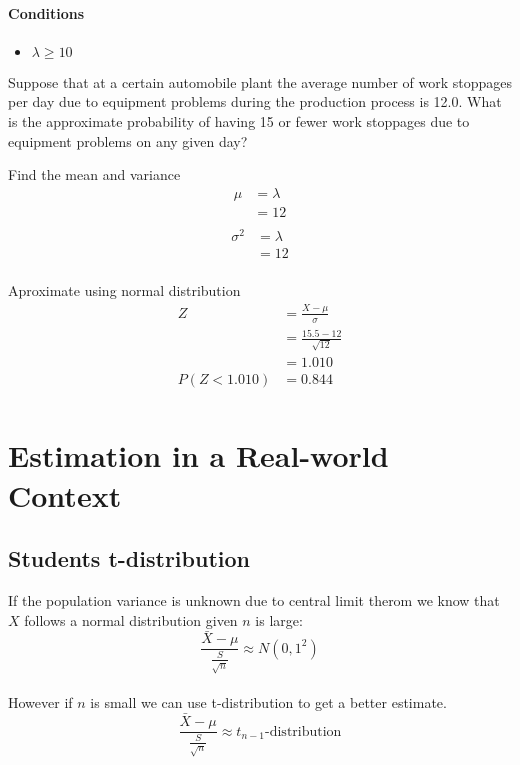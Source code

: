         \paragraph{Conditions}
        \begin{itemize}
            \item $\lambda \geq 10$
        \end{itemize}

        \begin{example}
        {
            Suppose that at a certain automobile plant the average number of work stoppages per day due to equipment problems during the production process is 12.0. What is the approximate probability of having 15 or fewer work stoppages due to equipment problems on any given day?
        }

        \begin{step}{Find the mean and variance}
        \begin{align*}
        \mu &= \lambda\\
        &= 12\\
        \end{align*}
        \begin{align*}
        \sigma^2 &= \lambda\\
        &= 12\\
        \end{align*}
        \end{step}

        \begin{step}{Aproximate using normal distribution}
        \begin{align*}
        Z &= \frac{X - \mu}{\sigma} \\
        &=\frac{15.5 - 12}{\sqrt{12}}\\
        &= 1.010\\
        P(Z < 1.010) &= 0.844\\
        \end{align*}
        \end{step}

        \end{example}

\section{Estimation in a Real-world Context}


    \subsection{Students t-distribution}
        If the population variance is unknown due to central limit therom we know that $X$ follows a normal distribution given $n$ is large:
        $$\frac{\bar{X} - \mu}{\displaystyle\frac{S}{\sqrt{n}}} \approx N(0, 1^2)$$
        \\
        However if $n$ is small we can use t-distribution to get a better estimate. 
        $$\frac{\bar{X} - \mu}{\displaystyle\frac{S}{\sqrt{n}}} \approx t_{n-1}\text{-distribution}$$


